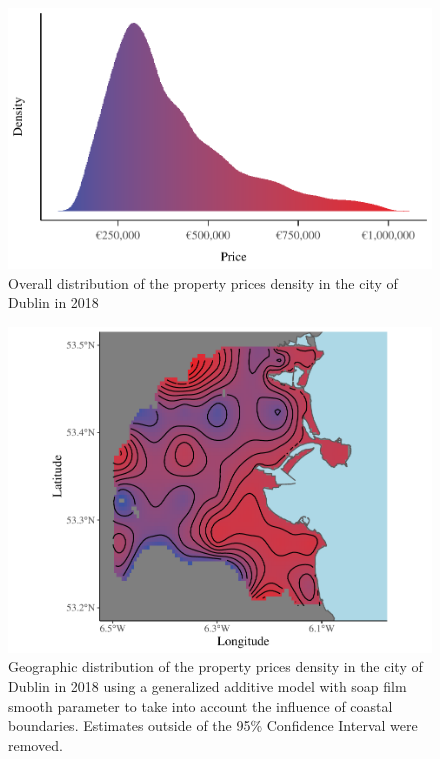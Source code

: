 \documentclass[conference,final,]{IEEEtran}
\begin{document}
\begin{figure}[!h]
\includegraphics[width=0.98\columnwidth]{manuscript_files/figure-latex/distrib-plot-1} \caption{Overall distribution of the property prices density in the city of Dublin in 2018}\label{fig:distrib-plot}
\end{figure}

\begin{figure}[!h]
\includegraphics[width=0.98\columnwidth]{manuscript_files/figure-latex/distrib-gps-1} \caption{Geographic distribution of the property prices density in the city of Dublin in 2018 using a generalized additive model with soap film smooth parameter to take into account the influence of coastal boundaries. Estimates outside of the 95\% Confidence Interval were removed.}\label{fig:distrib-gps}
\end{figure}
\end{document}
